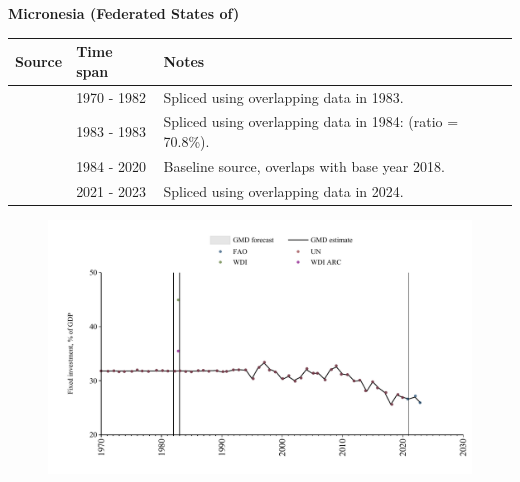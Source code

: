 \documentclass[12pt,a4paper,landscape]{article}
\begin{document}
\begin{adjustbox}{max totalsize={\paperwidth}{\paperheight},center}
\begin{minipage}[t][\textheight][t]{\textwidth}
\vspace*{0.5cm}
{}
\begin{center}
{\Large\bfseries Micronesia (Federated States of)}
\end{center}
\vspace{0.5cm}
\begin{table}[H]
\centering
\small
\begin{tabular}{|l|l|l|}
\hline
\textbf{Source} & \textbf{Time span} & \textbf{Notes} \\
\hline
\rowcolor{white}\cite{UN}& 1970 - 1982 &Spliced using overlapping data in 1983.\\
\rowcolor{lightgray}\cite{WDI}& 1983 - 1983 &Spliced using overlapping data in 1984: (ratio = 70.8\%).\\
\rowcolor{white}\cite{UN}& 1984 - 2020 &Baseline source, overlaps with base year 2018.\\
\rowcolor{lightgray}\cite{FAO}& 2021 - 2023 &Spliced using overlapping data in 2024.\\
\hline
\end{tabular}
\end{table}
\begin{figure}[H]
\centering
\includegraphics[width=\textwidth,height=0.6\textheight,keepaspectratio]{graphs/FSM_finv_GDP.pdf}
\end{figure}
\end{minipage}
\end{adjustbox}
\end{document}
